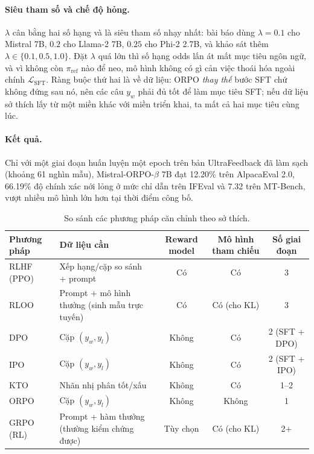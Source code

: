\paragraph{Siêu tham số và chế độ hỏng.} \( \lambda \) cân bằng hai số hạng và là siêu tham số nhạy nhất: bài báo dùng \( \lambda = 0.1 \) cho Mistral 7B, \( 0.2 \) cho Llama-2 7B, \( 0.25 \) cho Phi-2 2.7B, và khảo sát thêm \( \lambda \in \{0.1, 0.5, 1.0\} \). Đặt \( \lambda \) quá lớn thì số hạng odds lấn át mất mục tiêu ngôn ngữ, và vì không còn \( \pi_{\text{ref}} \) nào để neo, mô hình không có gì cản việc thoái hóa ngoài chính \( \mathcal{L}_{\text{SFT}} \). Ràng buộc thứ hai là về dữ liệu: ORPO \emph{thay thế} bước SFT chứ không đứng sau nó, nên các câu \( y_w \) phải đủ tốt để làm mục tiêu SFT; nếu dữ liệu sở thích lấy từ một miền khác với miền triển khai, ta mất cả hai mục tiêu cùng lúc.

\paragraph{Kết quả.} Chỉ với một giai đoạn huấn luyện một epoch trên bản UltraFeedback đã làm sạch (khoảng 61 nghìn mẫu), Mistral-ORPO-\( \beta \) 7B đạt 12.20\% trên AlpacaEval 2.0, 66.19\% độ chính xác nới lỏng ở mức chỉ dẫn trên IFEval và 7.32 trên MT-Bench, vượt nhiều mô hình lớn hơn tại thời điểm công bố.

\begin{table}[H]
\centering
\caption{So sánh các phương pháp căn chỉnh theo sở thích.}
\label{tab:alignment_methods_comparison}
\begin{tabularx}{\textwidth}{@{}lXccc@{}}
\toprule
\textbf{Phương pháp} & \textbf{Dữ liệu cần} & \textbf{Reward model} & \textbf{Mô hình tham chiếu} & \textbf{Số giai đoạn} \\
\midrule
RLHF (PPO) & Xếp hạng/cặp so sánh + prompt & Có & Có & 3 \\
RLOO & Prompt + mô hình thưởng (sinh mẫu trực tuyến) & Có & Có (cho KL) & 3 \\
DPO & Cặp $(y_w, y_l)$ & Không & Có & 2 (SFT + DPO) \\
IPO & Cặp $(y_w, y_l)$ & Không & Có & 2 (SFT + IPO) \\
KTO & Nhãn nhị phân tốt/xấu & Không & Có & 1--2 \\
ORPO & Cặp $(y_w, y_l)$ & Không & Không & 1 \\
GRPO (RL) & Prompt + hàm thưởng (thường kiểm chứng được) & Tùy chọn & Có (cho KL) & 2+ \\
\bottomrule
\end{tabularx}
\end{table}



